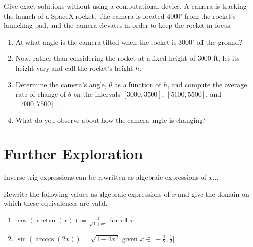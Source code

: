 \documentclass{ximera}
\begin{document}
\begin{exploration}
Give exact solutions without using a computational device.
%
A camera is tracking the launch of a SpaceX rocket. The camera is located $4000$' from the rocket's launching pad, and the camera elevates in order to keep the rocket in focus. 
\begin{enumerate}
\item At what angle is the camera tilted when the rocket is $3000$' off the ground?
%
\item[] Now, rather than considering the rocket at a fixed height of $3000$ ft, let its height vary and call the rocket's height $h$. 

\item Determine the camera's angle, $\theta$ as a function of $h$, and compute the average rate of change of $\theta$ on the intervals $[3000,3500]$, $[5000,5500]$, and $[7000,7500]$. 
%
\item What do you observe about how the camera angle is changing?
%
\end{enumerate}
\end{exploration}





\section{Further Exploration}

Inverse trig expressions can be rewritten as algebraic expressions of $x$...

\begin{example}
Rewrite the following values as algebraic expressions of $x$ and give the domain on which these equivalences are valid.
\begin{enumerate}
\item $\cos(\arctan(x)) = \frac{1}{\sqrt{1+x^2}}$ for all $x$ \\
%
\begin{explanation}

\end{explanation}
%
\item $\sin(\arccos(2x))= \sqrt{1-4x^2}$ given $x \in \Big[-\!\frac{1}{2}, \frac{1}{2}\Big]$\\
%
\begin{explanation}

\end{explanation}
%
\end{enumerate}
\end{example}
\end{document}
